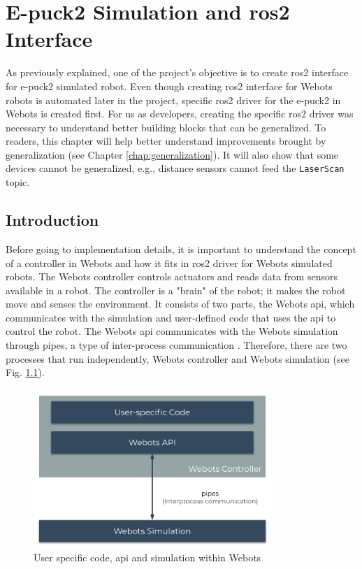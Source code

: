 \chapter{E-puck2 Simulation and \acs{ros2} Interface}
\label{chap:simulation}

As previously explained, one of the project's objective is to create \ac{ros2} interface for e-puck2 simulated robot. 
Even though creating \ac{ros2} interface for Webots robots is automated later in the project, specific \ac{ros2} driver for the e-puck2 in Webots is created first.
For us as developers, creating the specific \ac{ros2} driver was necessary to understand better building blocks that can be generalized.
To readers, this chapter will help better understand improvements brought by generalization (see Chapter \ref{chap:generalization}).
It will also show that some devices cannot be generalized, e.g., distance sensors cannot feed the \texttt{LaserScan} topic.

\section{Introduction}

Before going to implementation details, it is important to understand the concept of a controller in Webots and how it fits in \ac{ros2} driver for Webots simulated robots.
The Webots controller controls actuators and reads data from sensors available in a robot.
The controller is a "brain" of the robot; it makes the robot move and senses the environment.
It consists of two parts, the Webots \ac{api}, which communicates with the simulation and user-defined code that uses the \ac{api} to control the robot.
The Webots \ac{api} communicates with the Webots simulation through pipes, a type of inter-process communication \cite{kashyian_portable_2008}.
Therefore, there are two processes that run independently, Webots controller and Webots simulation (see Fig. \ref{fig:simulation:webots_user_code_and_api}).

\begin{figure}[H]
    \centering
    \includegraphics[width=0.8\textwidth]{simulation/figures/webots_user_code_and_api.pdf}
    \caption{User specific code, \ac{api} and simulation within Webots}
    \label{fig:simulation:webots_user_code_and_api}
\end{figure}


